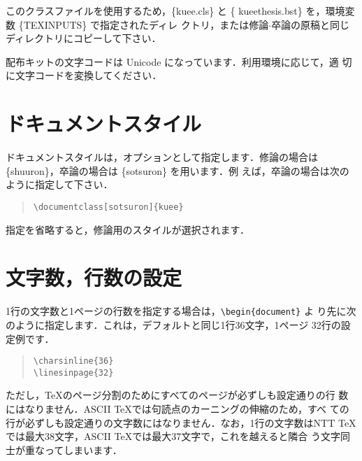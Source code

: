 \documentclass[
  sotsuron]{kuee}
\begin{document}
このクラスファイルを使用するため，\{\ttfamily kuee.cls\} と \{\ttfamily
kueethesis.bst\} を，環境変数 \{\ttfamily TEXINPUTS\} で指定されたディレ
クトリ，または修論\(\cdot\)卒論の原稿と同じディレクトリにコピーして下さい．

配布キットの文字コードは Unicode になっています．利用環境に応じて，適
切に文字コードを変換してください．

\hypertarget{ux30c9ux30adux30e5ux30e1ux30f3ux30c8ux30b9ux30bfux30a4ux30eb}{%
\section{ドキュメントスタイル}\label{ux30c9ux30adux30e5ux30e1ux30f3ux30c8ux30b9ux30bfux30a4ux30eb}}

ドキュメントスタイルは，オプションとして指定します．修論の場合は
\{\ttfamily shuuron\}，卒論の場合は \{\ttfamily sotsuron\}
を用います．例 えば，卒論の場合は次のように指定して下さい．

\begin{quote}
  \begin{verbatim}
\documentclass[sotsuron]{kuee}
\end{verbatim}
\end{quote}

指定を省略すると，修論用のスタイルが選択されます．

\hypertarget{ux6587ux5b57ux6570ux884cux6570ux306eux8a2dux5b9a}{%
\section{文字数，行数の設定}\label{ux6587ux5b57ux6570ux884cux6570ux306eux8a2dux5b9a}}

1行の文字数と1ページの行数を指定する場合は，\verb+\begin{document}+ よ
り先に次のように指定します．これは，デフォルトと同じ1行36文字，1ページ
32行の設定例です．

\begin{quote}
  \begin{verbatim}
\charsinline{36}
\linesinpage{32}
\end{verbatim}
\end{quote}

ただし，\TeX のページ分割のためにすべてのページが必ずしも設定通りの行
数にはなりません．ASCII \TeX では句読点のカーニングの伸縮のため，すべ
ての行が必ずしも設定通りの文字数にはなりません．なお，1行の文字数はNTT
\TeX では最大38文字，ASCII \TeX では最大37文字で，これを越えると隣合
う文字同士が重なってしまいます．
\end{document}
